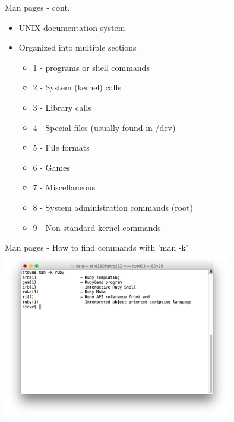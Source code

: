 \documentclass[t]{beamer}
\begin{document}
\begin{frame}{Man pages - cont.}
  \begin{itemize}
  \item UNIX documentation system
  \item Organized into multiple sections
    \begin{itemize}
    \item 1 - programs or shell commands
    \item 2 - System (kernel) calls
    \item 3 - Library calls
    \item 4 - Special files (usually found in /dev)
    \item 5 - File formats
    \item 6 - Games
    \item 7 - Miscellaneous
    \item 8 - System administration commands (root)
    \item 9 - Non-standard kernel commands
    \end{itemize}
  \end{itemize}
  \note{}
\end{frame}

\begin{frame}{Man pages - How to find commands with 'man -k'}
  \includegraphics[width=10cm,scale=0.4]{images/man-k.png}
\end{frame}
\end{document}
